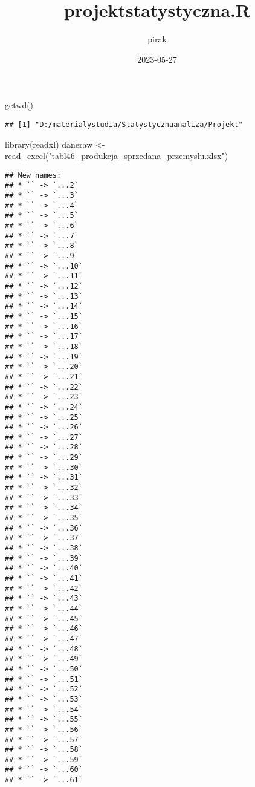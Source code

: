 \documentclass[
]{article}
\title{projektstatystyczna.R}
\author{pirak}
\date{2023-05-27}
\newenvironment{Shaded}{\begin{snugshade}}{\end{snugshade}}
\newcommand{\FunctionTok}[1]{\textcolor[rgb]{0.00,0.00,0.00}{#1}}
\newcommand{\NormalTok}[1]{#1}
\newcommand{\OtherTok}[1]{\textcolor[rgb]{0.56,0.35,0.01}{#1}}
\newcommand{\StringTok}[1]{\textcolor[rgb]{0.31,0.60,0.02}{#1}}
\begin{document}
\maketitle

\begin{Shaded}
\begin{Highlighting}[]
\FunctionTok{getwd}\NormalTok{()}
\end{Highlighting}
\end{Shaded}

\begin{verbatim}
## [1] "D:/materialystudia/Statystycznaanaliza/Projekt"
\end{verbatim}

\begin{Shaded}
\begin{Highlighting}[]
\FunctionTok{library}\NormalTok{(readxl)}
\NormalTok{daneraw }\OtherTok{\textless{}{-}} \FunctionTok{read\_excel}\NormalTok{(}\StringTok{"tabl46\_produkcja\_sprzedana\_przemyslu.xlsx"}\NormalTok{)}
\end{Highlighting}
\end{Shaded}

\begin{verbatim}
## New names:
## * `` -> `...2`
## * `` -> `...3`
## * `` -> `...4`
## * `` -> `...5`
## * `` -> `...6`
## * `` -> `...7`
## * `` -> `...8`
## * `` -> `...9`
## * `` -> `...10`
## * `` -> `...11`
## * `` -> `...12`
## * `` -> `...13`
## * `` -> `...14`
## * `` -> `...15`
## * `` -> `...16`
## * `` -> `...17`
## * `` -> `...18`
## * `` -> `...19`
## * `` -> `...20`
## * `` -> `...21`
## * `` -> `...22`
## * `` -> `...23`
## * `` -> `...24`
## * `` -> `...25`
## * `` -> `...26`
## * `` -> `...27`
## * `` -> `...28`
## * `` -> `...29`
## * `` -> `...30`
## * `` -> `...31`
## * `` -> `...32`
## * `` -> `...33`
## * `` -> `...34`
## * `` -> `...35`
## * `` -> `...36`
## * `` -> `...37`
## * `` -> `...38`
## * `` -> `...39`
## * `` -> `...40`
## * `` -> `...41`
## * `` -> `...42`
## * `` -> `...43`
## * `` -> `...44`
## * `` -> `...45`
## * `` -> `...46`
## * `` -> `...47`
## * `` -> `...48`
## * `` -> `...49`
## * `` -> `...50`
## * `` -> `...51`
## * `` -> `...52`
## * `` -> `...53`
## * `` -> `...54`
## * `` -> `...55`
## * `` -> `...56`
## * `` -> `...57`
## * `` -> `...58`
## * `` -> `...59`
## * `` -> `...60`
## * `` -> `...61`
\end{verbatim}
\end{document}
